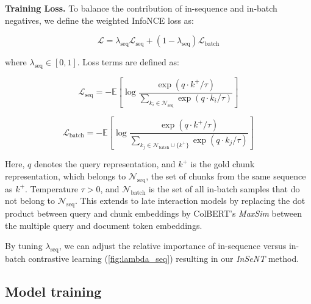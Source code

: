 


\noindent\textbf{Training Loss.} To balance the contribution of in-sequence and in-batch negatives, we define the weighted InfoNCE loss as:

\begin{equation}\label{eq:loss_weighted}
    \mathcal{L} = \lambda_{\text{seq}} \mathcal{L}_{\text{seq}} + (1 - \lambda_{\text{seq}}) \mathcal{L}_{\text{batch}}
\end{equation}

where \( \lambda_{\text{seq}} \in [0,1] \). Loss terms are defined as:

\begin{equation*}
    \mathcal{L}_{\text{seq}} = - \mathbb{E}\left[ \log \frac{\exp\left( q \cdot k^+ / \tau \right)}{\sum_{k_i \in \mathcal{N}_{\text{seq}}} \exp\left( q \cdot k_i / \tau \right)} \right]
\end{equation*}

\begin{equation*}
    \mathcal{L}_{\text{batch}} = - \mathbb{E}\left[ \log \frac{\exp\left( q \cdot k^+ / \tau \right)}{\sum_{k_j \in \mathcal{N}_{\text{batch}} \cup \{k^+\}} \exp\left( q \cdot k_j / \tau \right)} \right]
\end{equation*}

Here, \( q \) denotes the query representation, and \( k^+ \) is the gold chunk representation, which belongs to \( \mathcal{N}_{\text{seq}} \), the set of chunks from the same sequence as \( k^+ \). Temperature \( \tau > 0 \), and \( \mathcal{N}_{\text{batch}} \) is the set of all in-batch samples that do not belong to \( \mathcal{N}_{\text{seq}} \). This extends to late interaction models by replacing the dot product between query and chunk embeddings by ColBERT's \emph{MaxSim} between the multiple query and document token embeddings.

By tuning \( \lambda_{\text{seq}} \), we can adjust the relative importance of in-sequence versus in-batch contrastive learning (\autoref{fig:lambda_seq}) resulting in our \emph{InSeNT} method.




\subsection{Model training}

